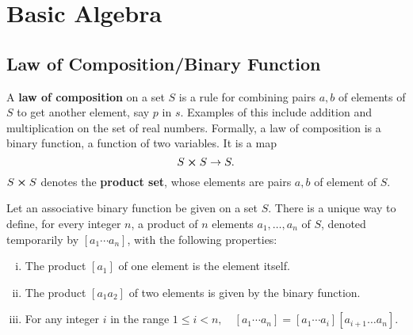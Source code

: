 \documentclass[main.tex]{subfiles}
\begin{document}
\chapter{Basic Algebra}
\section{Law of Composition/Binary Function}
A \textbf{law of composition} on a set $S$ is a rule for combining pairs $a, b$ of elements of $S$ to get another element, say $p$ in $s$. Examples of this include addition and multiplication on the set of real numbers. Formally, a law of composition is a binary function, a function of two variables. It is a map
$$ S \cross S \rightarrow S. $$
$S \cross S$ denotes the \textbf{product set}, whose elements are pairs $a,b$ of element of $S$. 

\begin{prop}
    Let an associative binary function be given on a set $S$. There is a unique way to define, for every integer $n$, a product of $n$ elements $a_1, \ldots, a_n$ of $S$, denoted temporarily by $\left[a_1 \cdots a_n\right]$, with the following properties:
    \begin{enumerate}[(i)]
        \item The product $\left[a_1\right]$ of one element is the element itself.
        \item The product $\left[a_1 a_2\right]$ of two elements is given by the binary function.
        \item For any integer $i$ in the range $1 \leq i<n, \quad\left[a_1 \cdots a_n\right]=\left[a_1 \cdots a_i\right]\left[a_{i+1} \ldots a_n\right]$.
    \end{enumerate}
\end{prop} 
\end{document}
